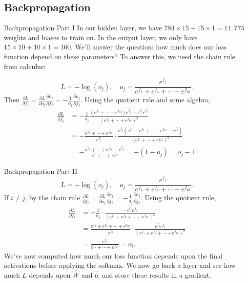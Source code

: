 \documentclass[xcolor=dvipsnames, fontsize=11pt, %
pagesize, %
parskip=half-, t]{beamer}
\begin{document}
 \subsection{Backpropagation}
  \begin{frame}{Backpropagation Part I}
In our hidden layer, we have $784\times 15+15\times 1=11,775$ weights and biases to train on. In the output layer, we only have $15\times 10+10\times 1=160$.  We'll answer the question: how much does our loss function depend on these parameters?  To answer this, we need the chain rule from calculus: 

$$L=-\log \left(o_j\right), \quad o_j=\frac{e^{f_j}}{e^{f_1}+e^{f_2}+\cdots+e^{f_{10}}}.$$
Then $\frac{\partial L}{\partial f_j}=\frac{\partial L}{\partial o_j}\frac{\partial o_j}{\partial f_j}=-\frac{1}{o_j}\frac{\partial o_j}{\partial f_j}$. Using the quotient rule and some algebra,  \begin{align*} \frac{\partial L}{\partial f_j}&=-\frac{1}{o_j}\frac{\left(e^{f_1}+\cdots+e^{f_{10}}\right)e^{f_j}-e^{f_j}e^{f_j}}{\left(e^{f_1}+\cdots+e^{f_{10}}\right)^2} \\ &=-\frac{e^{f_1}+\cdots+e^{f_{10}}}{e^{f_j}}\cdot \frac{e^{f_j}\left(e^{f_1}+e^{f_2}+\cdots+e^{f_{10}}-e^{f_j}\right)}{\left(e^{f_1}+\cdots+e^{f_{10}}\right)^2} \\ &=-\frac{e^{f_1}+\cdots+e^{f_{10}}-e^{f_j}}{e^{f_1}+\cdots+e^{f_{10}}}=-\left(1-o_j\right)=o_j-1. \end{align*}

  \end{frame}
  \begin{frame}{Backpropagation Part II}
$$L=-\log \left(o_j\right), \quad o_j=\frac{e^{f_j}}{e^{f_1}+e^{f_2}+\cdots+e^{f_{10}}}.$$   If $i\neq j$, by the chain rule $\frac{\partial L}{\partial f_i}=\frac{\partial L}{\partial o_j}\frac{\partial o_j}{\partial f_i}=-\frac{1}{o_j}\frac{\partial o_j}{\partial f_i}.$  Using the quotient rule, \begin{align*} \frac{\partial L}{\partial f_i} &=-\frac{1}{o_j}\cdot \frac{-e^{f_j}e^{f_i}}{\left(e^{f_1}+e^{f_2}+\cdots+e^{f_{10}}\right)^2} \\ &=\frac{e^{f_1}+e^{f_2}+\cdots+e^{f_{10}}}{e^{f_j}}\cdot \frac{e^{f_j}e^{f_i}}{\left(e^{f_1}+e^{f_2}+\cdots+e^{f_{10}}\right)^2} \\ &=\frac{e^{f_i}}{e^{f_1}+\cdots+e^{f_{10}}}=o_i. \end{align*} 
We've now computed how much our loss function depends upon the final activations before applying the softmax.  We now go back a layer and see how much $L$ depends upon $\hat{W}$ and $\hat{b}$, and store these results in a gradient.
\end{frame}
\end{document}
